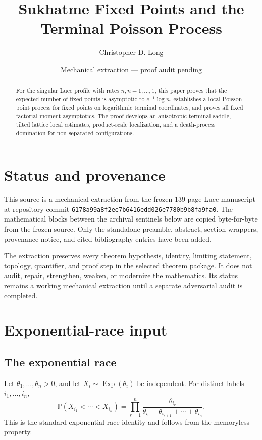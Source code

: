 \documentclass[11pt]{article}
\title{Sukhatme Fixed Points and the Terminal Poisson Process}
\author{Christopher D. Long}
\date{Mechanical extraction --- proof audit pending}
\theoremstyle{remark}
\newcommand{\Pp}{\mathbb P}
\newcommand{\Exp}{\operatorname{Exp}}
\begin{document}
\maketitle
\begin{abstract}
For the singular Luce profile with rates \(n,n-1,\ldots,1\), this paper proves that the expected number of fixed points is asymptotic to \(e^{-1}\log n\), establishes a local Poisson point process for fixed points on logarithmic terminal coordinates, and proves all fixed factorial-moment asymptotics. The proof develops an anisotropic terminal saddle, tilted lattice local estimates, product-scale localization, and a death-process domination for non-separated configurations.
\end{abstract}
\tableofcontents
\section{Status and provenance}
This source is a mechanical extraction from the frozen 139-page Luce manuscript at repository commit \texttt{6178a99a8f2ee7b6416edd026e7780b9b8fa9fa0}. The mathematical blocks between the archival sentinels below are copied byte-for-byte from the frozen source. Only the standalone preamble, abstract, section wrappers, provenance notice, and cited bibliography entries have been added.

The extraction preserves every theorem hypothesis, identity, limiting statement, topology, quantifier, and proof step in the selected theorem package. It does not audit, repair, strengthen, weaken, or modernize the mathematics. Its status remains a working mechanical extraction until a separate adversarial audit is completed.

\section{Exponential-race input}

\subsection{The exponential race}
Let \(\theta_1,\ldots,\theta_n>0\), and let \(X_i\sim\Exp(\theta_i)\) be independent.  For distinct labels \(i_1,\ldots,i_n\),
\[
\Pp(X_{i_1}<\cdots<X_{i_n})
= \prod_{r=1}^n
 \frac{\theta_{i_r}}{\theta_{i_r}+\theta_{i_{r+1}}+\cdots+\theta_{i_n}}.
\]
This is the standard exponential race identity and follows from the memoryless property.
\end{document}
